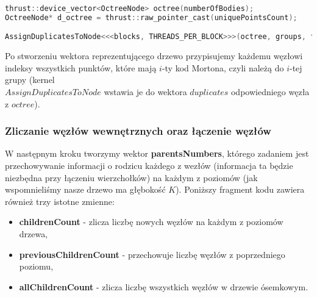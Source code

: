 \documentclass[14pt,twoside,a4paper]{article}
\theoremstyle{definition}
\begin{document}
\begin{lstlisting}[language=C++, frame=single, framerule=2pt, caption=Stworzenie wektora octree]
thrust::device_vector<OctreeNode> octree(numberOfBodies);
OctreeNode* d_octree = thrust::raw_pointer_cast(uniquePointsCount);

AssignDuplicatesToNode<<<blocks, THREADS_PER_BLOCK>>>(octree, groups, first, last);
\end{lstlisting}
Po stworzeniu wektora reprezentującego drzewo przypisujemy każdemu węzłowi indeksy wszystkich punktów, które mają $i$-ty kod Mortona, czyli należą do $i$-tej grupy (kernel \\$AssignDuplicatesToNode$ wstawia je do wektora $duplicates$ odpowiedniego węzła z $octree$).
\subsubsection{\large Zliczanie węzłów wewnętrznych oraz łączenie węzłów}

W następnym kroku tworzymy wektor \textbf{parentsNumbers}, którego zadaniem jest przechowywanie informacji o rodzicu każdego z wezłów (informacja ta będzie niezbędna przy łączeniu wierzchołków) na każdym z poziomów (jak wspomnieliśmy nasze drzewo ma głębokość $K$). Poniższy fragment kodu zawiera również trzy istotne zmienne:
\begin{itemize}
\item \textbf{childrenCount} - zlicza liczbę nowych węzłów na każdym z poziomów drzewa,
\item \textbf{previousChildrenCount} - przechowuje liczbę węzłów z poprzedniego poziomu,
\item \textbf{allChildrenCount} - zlicza liczbę wszystkich węzłów w drzewie ósemkowym.
\end{itemize}
\end{document}
